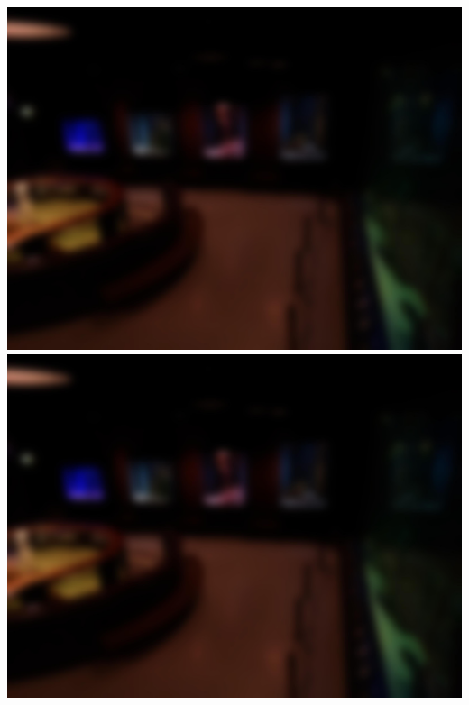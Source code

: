 \includegraphics[width=\textwidth]{Images/DeviceImages/1st-iteration/cal1.jpg}
\includegraphics[width=\textwidth]{Images/DeviceImages/1st-iteration/cal1.jpg}